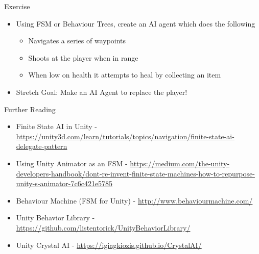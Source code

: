 \begin{frame}{Exercise}
\begin{itemize}
	\item Using FSM or Behaviour Trees, create an AI agent which does the following
	\begin{itemize}
		\item Navigates a series of waypoints
		\item Shoots at the player when in range
		\item When low on health it attempts to heal by collecting an item
	\end{itemize}
	\item Stretch Goal: Make an AI Agent to replace the player!
\end{itemize}
\end{frame}
\begin{frame}{Further Reading}
	\begin{itemize}
		\item Finite State AI in Unity - \url{https://unity3d.com/learn/tutorials/topics/navigation/finite-state-ai-delegate-pattern}
		\item Using Unity Animator as an FSM - \url{https://medium.com/the-unity-developers-handbook/dont-re-invent-finite-state-machines-how-to-repurpose-unity-s-animator-7c6c421e5785}
		\item Behaviour Machine (FSM for Unity) - \url{http://www.behaviourmachine.com/}
		\item Unity Behavior Library - \url{https://github.com/listentorick/UnityBehaviorLibrary/}
		\item Unity Crystal AI - \url{https://igiagkiozis.github.io/CrystalAI/}
	\end{itemize}
\end{frame}

